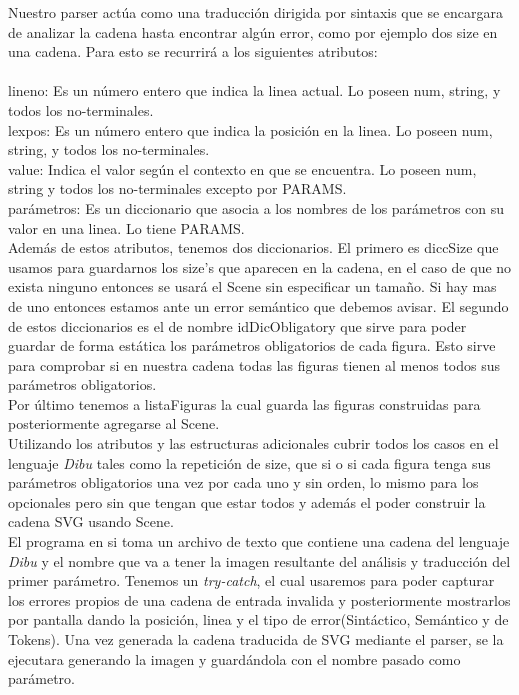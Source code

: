 Nuestro parser actúa como una traducción dirigida por sintaxis que se encargara de analizar la cadena hasta encontrar
algún error, como por ejemplo dos size en una cadena. Para esto se recurrirá a los siguientes atributos:\\
\\
lineno: Es un número entero que indica la linea actual. Lo poseen num, string, y todos los no-terminales.\\
lexpos: Es un número entero que indica la posición en la linea. Lo poseen num, string, y todos los no-terminales.\\
value: Indica el valor según el contexto en que se encuentra. Lo poseen num, string y todos los no-terminales excepto
por PARAMS.\\
parámetros: Es un diccionario que asocia a los nombres de los parámetros con su valor en una linea. Lo tiene PARAMS.\\

Además de estos atributos, tenemos dos diccionarios. El primero es diccSize que usamos para guardarnos los size's que
aparecen en la cadena, en el caso de que no exista ninguno entonces se usará el Scene sin especificar un tamaño. Si hay
mas de uno entonces estamos ante un error semántico que debemos avisar. El segundo de estos diccionarios es el de nombre
idDicObligatory que sirve para poder guardar de forma estática los parámetros obligatorios de cada figura. Esto sirve
para comprobar si en nuestra cadena todas las figuras tienen al menos todos sus parámetros obligatorios.\\

Por último tenemos a listaFiguras la cual guarda las figuras construidas para posteriormente agregarse al Scene.\\

Utilizando los atributos y las estructuras adicionales cubrir todos los casos en el lenguaje \textit{Dibu} tales como
la repetición de size, que si o si cada figura tenga sus parámetros obligatorios una vez por cada uno y sin orden, lo
mismo para los opcionales pero sin que tengan que estar todos y además el poder construir la cadena SVG usando Scene.\\

El programa en si toma un archivo de texto que contiene una cadena del lenguaje \textit{Dibu} y el nombre que va a tener
la imagen resultante del análisis y traducción del primer parámetro. Tenemos un \textit{try-catch}, el cual usaremos
para poder capturar los errores propios de una cadena de entrada invalida y posteriormente mostrarlos por pantalla
dando la posición, linea y el tipo de error(Sintáctico, Semántico y de Tokens). Una vez generada la cadena traducida
de SVG mediante el parser, se la ejecutara generando la imagen y guardándola con el nombre pasado como parámetro.
